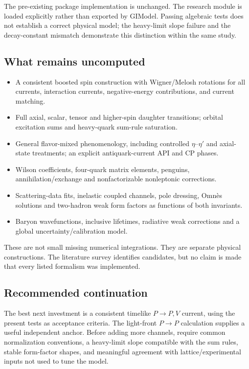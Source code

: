 \documentclass[11pt,a4paper]{article}
\begin{document}
The pre-existing package implementation is unchanged. The research module is loaded explicitly rather than exported by GIModel. Passing algebraic tests does not establish a correct physical model; the heavy-limit slope failure and the decay-constant mismatch demonstrate this distinction within the same study.

\subsection{What remains uncomputed}
\begin{itemize}
\item A consistent boosted spin construction with Wigner/Melosh rotations for all currents, interaction currents, negative-energy contributions, and current matching.
\item Full axial, scalar, tensor and higher-spin daughter transitions; orbital excitation sums and heavy-quark sum-rule saturation.
\item General flavor-mixed phenomenology, including controlled $\eta$--$\eta'$ and axial-state treatments; an explicit antiquark-current API and CP phases.
\item Wilson coefficients, four-quark matrix elements, penguins, annihilation/exchange and nonfactorizable nonleptonic corrections.
\item Scattering-data fits, inelastic coupled channels, pole dressing, Omn\`es solutions and two-hadron weak form factors as functions of both invariants.
\item Baryon wavefunctions, inclusive lifetimes, radiative weak corrections and a global uncertainty/calibration model.
\end{itemize}
These are not small missing numerical integrations. They are separate physical constructions. The literature survey identifies candidates, but no claim is made that every listed formalism was implemented.

\subsection{Recommended continuation}
The best next investment is a consistent timelike $P\to P,V$ current, using the present tests as acceptance criteria. The light-front $P\to P$ calculation supplies a useful independent anchor. Before adding more channels, require common normalization conventions, a heavy-limit slope compatible with the sum rules, stable form-factor shapes, and meaningful agreement with lattice/experimental inputs not used to tune the model.
\end{document}
